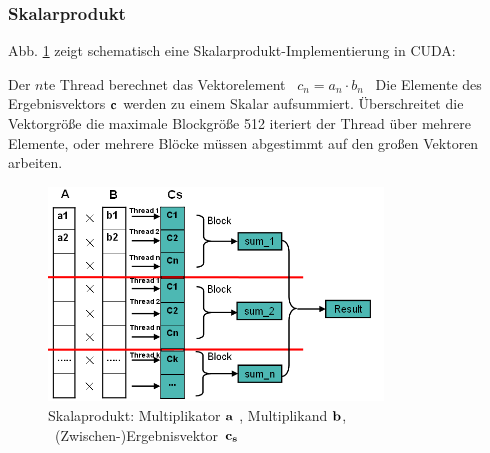 


\subsubsection{Skalarprodukt}

Abb. \ref{Vektor} zeigt schematisch eine Skalarprodukt-Implementierung in CUDA:

Der $n$te Thread berechnet das Vektorelement \mbox{ $c_n = a_n \cdot b_n$ }
Die Elemente des Ergebnisvektors $ \bf c $ werden  zu einem Skalar
aufsummiert.
Überschreitet die Vektorgröße die maximale Blockgröße 512 iteriert der Thread
über mehrere Elemente, oder mehrere Blöcke müssen
abgestimmt auf den großen Vektoren arbeiten.


\begin{figure}[htbp]
\includegraphics[width=3.5in]{../xby/pic/Vektor}
\caption{ \label{Vektor} Skalaprodukt: Multiplikator $ \bf a$ , Multiplikand $ \bf b$,
\mbox{ (Zwischen-)Ergebnisvektor $\bf c_s$ }}

\end{figure}